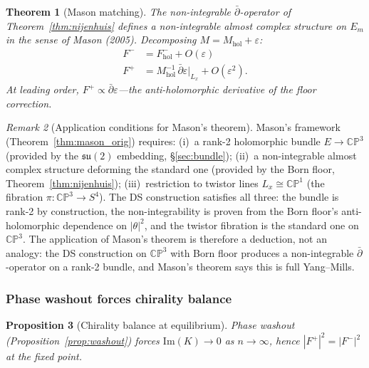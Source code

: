 \documentclass[11pt,a4paper]{article}
\newtheorem{theorem}{Theorem}[section]
\newtheorem{proposition}[theorem]{Proposition}
\theoremstyle{definition}
\theoremstyle{remark}
\newtheorem{remark}[theorem]{Remark}
\newcommand{\CP}{\mathbb{CP}}
\newcommand{\dbar}{\bar{\partial}}
\newcommand{\su}{\mathfrak{su}}
\begin{document}
\begin{theorem}[Mason matching]\label{thm:mason}
The non-integrable $\dbar$-operator of Theorem~\ref{thm:nijenhuis} defines a non-integrable almost complex structure on $E_m$ in the sense of Mason (2005). Decomposing $M=M_{\mathrm{hol}}+\varepsilon$:
\begin{align}
F^-&=F^-_{\mathrm{hol}}+O(\varepsilon) \\
F^+&=M_{\mathrm{hol}}^{-1}\,\dbar\varepsilon\big|_{L_x}+O(\varepsilon^2).
\end{align}
At leading order, $F^+\propto\dbar\varepsilon$---the anti-holomorphic derivative of the floor correction.
\end{theorem}

\begin{remark}[Application conditions for Mason's theorem]\label{rem:mason_conditions}
Mason's framework (Theorem~\ref{thm:mason_orig}) requires: (i)~a rank-2 holomorphic bundle $E\to\CP^3$ (provided by the $\su(2)$ embedding, \S\ref{sec:bundle}); (ii)~a non-integrable almost complex structure deforming the standard one (provided by the Born floor, Theorem~\ref{thm:nijenhuis}); (iii)~restriction to twistor lines $L_x\cong\CP^1$ (the fibration $\pi:\CP^3\to S^4$). The DS construction satisfies all three: the bundle is rank-2 by construction, the non-integrability is proven from the Born floor's anti-holomorphic dependence on $|\theta|^2$, and the twistor fibration is the standard one on $\CP^3$. The application of Mason's theorem is therefore a deduction, not an analogy: the DS construction on $\CP^3$ with Born floor produces a non-integrable $\dbar$-operator on a rank-2 bundle, and Mason's theorem says this is full Yang--Mills.
\end{remark}


\subsubsection{Phase washout forces chirality balance}

\begin{proposition}[Chirality balance at equilibrium]\label{prop:balance}
Phase washout (Proposition~\ref{prop:washout}) forces $\mathrm{Im}(K)\to 0$ as $n\to\infty$, hence $|F^+|^2=|F^-|^2$ at the fixed point.
\end{proposition}
\end{document}
